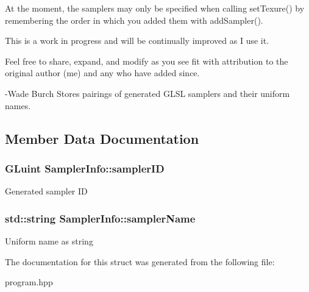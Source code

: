 At the moment, the samplers may only be specified when calling set\-Texure() by remembering the order in which you added them with add\-Sampler().

This is a work in progress and will be continually improved as I use it.

Feel free to share, expand, and modify as you see fit with attribution to the original author (me) and any who have added since.

-\/\-Wade Burch Stores pairings of generated G\-L\-S\-L samplers and their uniform names. 

\subsection{Member Data Documentation}
\hypertarget{structSamplerInfo_a59a388ce01f16caf9e2b5ec1bf14ac9e}{
\subsubsection[{sampler\-I\-D}]{\setlength{\rightskip}{0pt plus 5cm}G\-Luint Sampler\-Info\-::sampler\-I\-D}}\label{structSamplerInfo_a59a388ce01f16caf9e2b5ec1bf14ac9e}
Generated sampler I\-D \hypertarget{structSamplerInfo_a7906eb3a44b5726904ab84e971e83214}{
\subsubsection[{sampler\-Name}]{\setlength{\rightskip}{0pt plus 5cm}std\-::string Sampler\-Info\-::sampler\-Name}}\label{structSamplerInfo_a7906eb3a44b5726904ab84e971e83214}
Uniform name as string 

The documentation for this struct was generated from the following file\-:\begin{DoxyCompactItemize}
\item 
program.\-hpp\end{DoxyCompactItemize}
